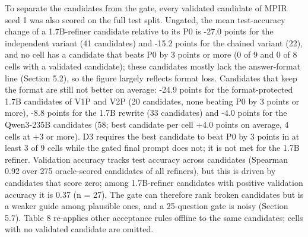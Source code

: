 \documentclass{ieeeaccess}
\begin{document}
To separate the candidates from the gate, every validated candidate of MPIR seed 1 was also scored on the full test split. Ungated, the mean test-accuracy change of a 1.7B-refiner candidate relative to its P0 is -27.0 points for the independent variant (41 candidates) and -15.2 points for the chained variant (22), and no cell has a candidate that beats P0 by 3 points or more (0 of 9 and 0 of 8 cells with a validated candidate); these candidates mostly lack the answer-format line (Section 5.2), so the figure largely reflects format loss. Candidates that keep the format are still not better on average: -24.9 points for the format-protected 1.7B candidates of V1P and V2P (20 candidates, none beating P0 by 3 points or more), -8.8 points for the 1.7B rewrite (33 candidates) and -4.0 points for the Qwen3-235B candidates (58; best candidate per cell +4.0 points on average, 4 cells at +3 or more). D3 requires the best candidate to beat P0 by 3 points in at least 3 of 9 cells while the gated final prompt does not; it is not met for the 1.7B refiner. Validation accuracy tracks test accuracy across candidates (Spearman 0.92 over 275 oracle-scored candidates of all refiners), but this is driven by candidates that score zero; among 1.7B-refiner candidates with positive validation accuracy it is 0.37 (n = 27). The gate can therefore rank broken candidates but is a weaker guide among plausible ones, and a 25-question gate is noisy (Section 5.7). Table 8 re-applies other acceptance rules offline to the same candidates; cells with no validated candidate are omitted.
\end{document}
